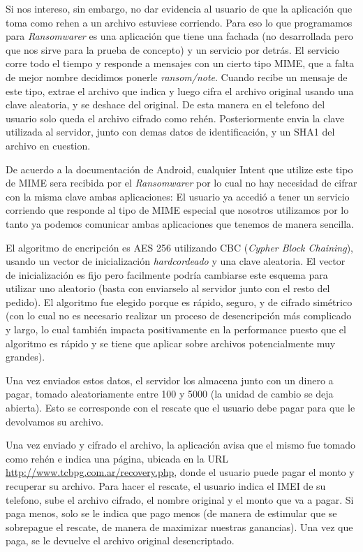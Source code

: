 Si nos intereso, sin embargo, no dar evidencia al usuario de que la aplicación que toma como rehen a un archivo estuviese corriendo. Para
eso lo que programamos para \textit{Ransomwarer} es una aplicación que tiene una fachada (no desarrollada pero que nos sirve para la
prueba de concepto) y un servicio por detrás. El servicio corre todo el tiempo y responde a mensajes con un cierto tipo MIME, que a falta
de mejor nombre decidimos ponerle \textit{ransom/note}. Cuando recibe un mensaje de este tipo, extrae el archivo que indica y luego cifra
el archivo original usando una clave aleatoria, y se deshace del original. De esta manera en el telefono del usuario solo queda el archivo
cifrado como rehén. Posteriormente envia la clave utilizada al servidor, junto con demas datos de identificación, y un SHA1 del archivo
en cuestion.

De acuerdo a la documentación de Android, cualquier Intent que utilize este tipo de MIME sera recibida por el \textit{Ransomwarer} por lo cual
no hay necesidad de cifrar con la misma clave ambas aplicaciones: El usuario ya accedió a tener un servicio corriendo que responde al tipo de
MIME especial que nosotros utilizamos por lo tanto ya podemos comunicar ambas aplicaciones que tenemos de manera sencilla.

El algoritmo de encripción es AES 256 utilizando CBC (\textit{Cypher Block Chaining}), usando un vector de inicialización \textit{hardcordeado}
y una clave aleatoria. El vector de inicialización es fijo pero facilmente podría cambiarse este esquema para utilizar uno aleatorio (basta con
enviarselo al servidor junto con el resto del pedido). El algoritmo fue elegido porque es rápido, seguro, y de cifrado simétrico (con lo cual
no es necesario realizar un proceso de desencripción más complicado y largo, lo cual también impacta positivamente en la performance puesto que
el algoritmo es rápido y se tiene que aplicar sobre archivos potencialmente muy grandes).

Una vez enviados estos datos, el servidor los almacena junto con un dinero a pagar, tomado aleatoriamente entre 100 y 5000 (la unidad de cambio
se deja abierta). Esto se corresponde con el rescate que el usuario debe pagar para que le devolvamos su archivo.

Una vez enviado y cifrado el archivo, la aplicación avisa que el mismo fue tomado como rehén e indica una página, ubicada en la URL
\url{http://www.tcbpg.com.ar/recovery.php}, donde el usuario puede pagar el monto y recuperar su archivo. Para hacer el rescate, el usuario
indica el IMEI de su telefono, sube el archivo cifrado, el nombre original y el monto que va a pagar. Si paga menos, solo se le indica que pago
menos (de manera de estimular que se sobrepague el rescate, de manera de maximizar nuestras ganancias). Una vez que paga, se le devuelve el
archivo original desencriptado.

